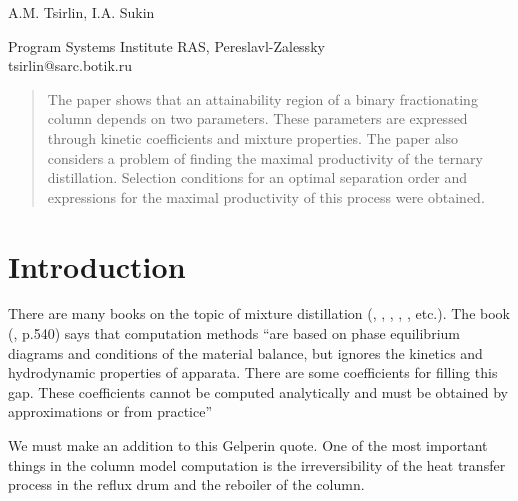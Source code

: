 \documentclass[12pt]{article}
\begin{document}
\begin{center}
\end{center}

\begin{center}
\hspace{0.5cm} \large{A.M. Tsirlin, I.A. Sukin}
\end{center}

\begin{center}
Program Systems Institute RAS, Pereslavl-Zalessky\\
tsirlin@sarc.botik.ru
\end{center}

\begin{abstract} 
The paper shows that an attainability region of a binary fractionating column depends on two parameters. These parameters are expressed through kinetic coefficients and mixture properties. The paper also considers a problem of finding the maximal productivity of the ternary distillation. Selection conditions for an optimal separation order and expressions for the maximal productivity of this process were obtained. 
\end{abstract}


\section{Introduction}
  There are many books on the topic of mixture distillation (\cite{Holland}, \cite{Gelp}, \cite{stich}, \cite{shinskey}, \cite{rose}, etc.). The book (\cite{Gelp}, p.540) says that computation methods ``are based on phase equilibrium diagrams and conditions of the material balance, but ignores the kinetics and hydrodynamic properties of apparata. There are some coefficients for filling this gap. These coefficients cannot be computed analytically and must be obtained by approximations or from practice''

We must make an addition to this Gelperin quote. One of the most important things in the column model computation is the irreversibility of the heat transfer process in the reflux drum and the reboiler of the column.
  
\end{document}
